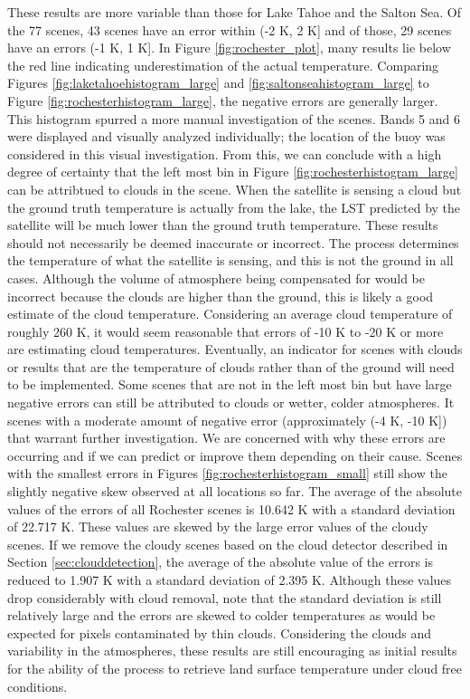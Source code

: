 \documentclass{book}
\begin{document}
These results are more variable than those for Lake Tahoe and the Salton Sea.  Of the 77 scenes, 43 scenes have an error within (-2 K, 2 K] and of those, 29 scenes have an errors (-1 K, 1 K].  In Figure \ref{fig:rochester_plot}, many results lie below the red line indicating underestimation of the actual temperature.  Comparing Figures \ref{fig:laketahoehistogram_large} and \ref{fig:saltonseahistogram_large} to Figure \ref{fig:rochesterhistogram_large}, the negative errors are generally larger.  This histogram spurred a more manual investigation of the scenes.  Bands 5 and 6 were displayed and visually analyzed individually; the location of the buoy was considered in this visual investigation.  From this, we can conclude with a high degree of certainty that the left most bin in Figure \ref{fig:rochesterhistogram_large} can be attribtued to clouds in the scene.  When the satellite is sensing a cloud but the ground truth temperature is actually from the lake, the LST predicted by the satellite will be much lower than the ground truth temperature.  These results should not necessarily be deemed inaccurate or incorrect.  The process determines the temperature of what the satellite is sensing, and this is not the ground in all cases.  Although the volume of atmosphere being compensated for would be incorrect because the clouds are higher than the ground, this is likely a good estimate of the cloud temperature.  Considering an average cloud temperature of roughly 260 K, it would seem reasonable that errors of -10 K to -20 K or more are estimating cloud temperatures.  Eventually, an indicator for scenes with clouds or results that are the temperature of clouds rather than of the ground will need to be implemented.  Some scenes that are not in the left most bin but have large negative errors can still be attributed to clouds or wetter, colder atmospheres.  It scenes with a moderate amount of negative error (approximately (-4 K, -10 K]) that warrant further investigation.  We are concerned with why these errors are occurring and if we can predict or improve them depending on their cause.  Scenes with the smallest errors in Figures \ref{fig:rochesterhistogram_small} still show the slightly negative skew observed at all locations so far.  The average of the absolute values of the errors of all Rochester scenes is 10.642 K with a standard deviation of 22.717 K.  These values are skewed by the large error values of the cloudy scenes.  If we remove the cloudy scenes based on the cloud detector described in Section \ref{sec:clouddetection}, the average of the absolute value of the errors is reduced to 1.907 K with a standard deviation of 2.395 K.  Although these values drop considerably with cloud removal, note that the standard deviation is still relatively large and the errors are skewed to colder temperatures as would be expected for pixels contaminated by thin clouds.  Considering the clouds and variability in the atmospheres, these results are still encouraging as initial results for the ability of the process to retrieve land surface temperature under cloud free conditions.
\end{document}
